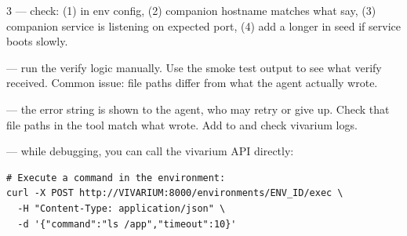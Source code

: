 \documentclass[10pt,landscape]{article}
\begin{document}
\begin{multicols}{3}
 --- check: (1)  in env config, (2) companion hostname matches what  say, (3) companion service is listening on expected port, (4) add a longer  in seed if service boots slowly.

 --- run the verify logic manually. Use the smoke test output to see what verify received. Common issue: file paths differ from what the agent actually wrote.

 --- the error string is shown to the agent, who may retry or give up. Check that file paths in the tool match what  wrote. Add  to  and check vivarium logs.

 --- while debugging, you can call the vivarium API directly:

\begin{lstlisting}
# Execute a command in the environment:
curl -X POST http://VIVARIUM:8000/environments/ENV_ID/exec \
  -H "Content-Type: application/json" \
  -d '{"command":"ls /app","timeout":10}'
\end{lstlisting}


\end{multicols}
\end{document}

